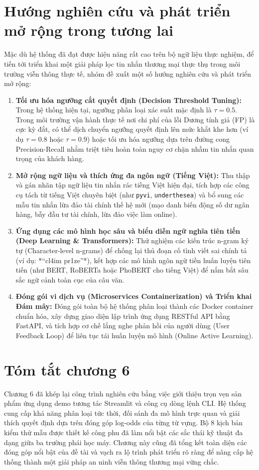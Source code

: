 \section{Hướng nghiên cứu và phát triển mở rộng trong tương lai}
\label{sec:huong-phat-trien}

Mặc dù hệ thống đã đạt được hiệu năng rất cao trên bộ ngữ liệu thực nghiệm, để tiến tới triển khai một giải pháp lọc tin nhắn thương mại thực thụ trong môi trường viễn thông thực tế, nhóm đề xuất một số hướng nghiên cứu và phát triển mở rộng:
\begin{enumerate}
    \item \textbf{Tối ưu hóa ngưỡng cắt quyết định (Decision Threshold Tuning):}
    Trong hệ thống hiện tại, ngưỡng phân loại xác suất mặc định là $\tau = 0.5$. Trong môi trường vận hành thực tế nơi chi phí của lỗi Dương tính giả (FP) là cực kỳ đắt, có thể dịch chuyển ngưỡng quyết định lên mức khắt khe hơn (ví dụ $\tau = 0.8$ hoặc $\tau = 0.9$) hoặc tối ưu hóa ngưỡng dựa trên đường cong Precision-Recall nhằm triệt tiêu hoàn toàn nguy cơ chặn nhầm tin nhắn quan trọng của khách hàng.
    \item \textbf{Mở rộng ngữ liệu và thích ứng đa ngôn ngữ (Tiếng Việt):}
    Thu thập và gán nhãn tập ngữ liệu tin nhắn rác tiếng Việt hiện đại, tích hợp các công cụ tách từ tiếng Việt chuyên biệt (như \texttt{pyvi}, \texttt{underthesea}) và bổ sung các mẫu tin nhắn lừa đảo tài chính thế hệ mới (mạo danh biến động số dư ngân hàng, bẫy đầu tư tài chính, lừa đảo việc làm online).
    \item \textbf{Ứng dụng các mô hình học sâu và biểu diễn ngữ nghĩa tiên tiến (Deep Learning \& Transformers):}
    Thử nghiệm các kiến trúc n-gram ký tự (Character-level n-grams) để chống lại thủ đoạn cố tình viết sai chính tả (ví dụ: *“cl4im pr1ze”*), kết hợp các mô hình ngôn ngữ tiền huấn luyện tiên tiến (như BERT, RoBERTa hoặc PhoBERT cho tiếng Việt) để nắm bắt sâu sắc ngữ cảnh toàn cục của câu văn.
    \item \textbf{Đóng gói vi dịch vụ (Microservices Containerization) và Triển khai Đám mây:}
    Đóng gói toàn bộ hệ thống phân loại thành các Docker container chuẩn hóa, xây dựng giao diện lập trình ứng dụng RESTful API bằng FastAPI, và tích hợp cơ chế lắng nghe phản hồi của người dùng (User Feedback Loop) để liên tục tái huấn luyện mô hình (Online Active Learning).
\end{enumerate}

\section{Tóm tắt chương 6}
Chương 6 đã khép lại công trình nghiên cứu bằng việc giới thiệu trọn vẹn sản phẩm ứng dụng demo tương tác Streamlit và công cụ dòng lệnh CLI. Hệ thống cung cấp khả năng phân loại tức thời, đối sánh đa mô hình trực quan và giải thích quyết định dựa trên đóng góp log-odds của từng từ vựng. Bộ 8 kịch bản kiểm thử mẫu được thiết kế công phu đã làm nổi bật các sắc thái kỹ thuật đa dạng giữa ba trường phái học máy. Chương này cũng đã tổng kết toàn diện các đóng góp nổi bật của đề tài và vạch ra lộ trình phát triển rõ ràng để nâng cấp hệ thống thành một giải pháp an ninh viễn thông thương mại vững chắc.